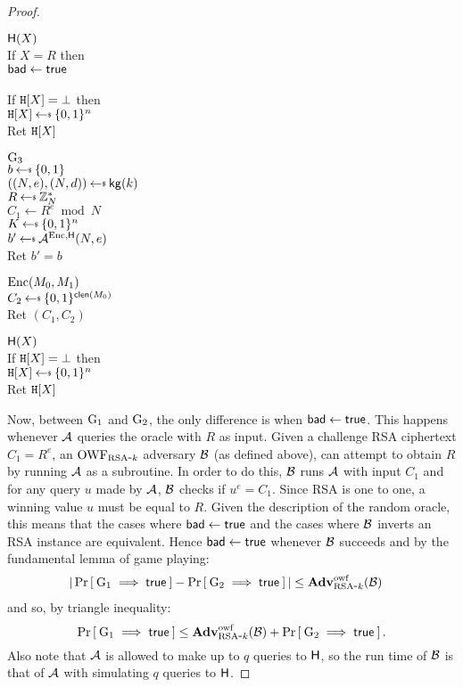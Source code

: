 \begin{proof}
\begin{center}
{\underline{$\mathsf{H}(X)$}\\
If $X = R$ then\\
\myInd $\mathsf{bad}\gets\mathsf{true}$\\
\myInd {}\\
If $\mathtt{H}[X] = \bot$  then\\
\myInd $\TabH[X] \getsr \bits^n$\\
Ret $\mathtt{H}[X]$
}{
\underline{${{\textnormal G}}_3$}\\ %
$b \getsr \bits$\\
$((N,e),(N,d)) \getsr \kg(k)$\\
$R \getsr \Z^*_N$\\
$C_1 \gets R^e \bmod N$\\
$K \getsr \bits^n$\\
$b' \getsr \advA^{\EncOracle,\Horacle}(N,e)$\\
Ret $b'=b$\medskip

\underline{$\textnormal{Enc}(M_0,M_1)$}\\
$C_2 \getsr \bits^{\ctxtlen(M_0)}$\\
Ret $(C_1,C_2)$\medskip

\underline{$\mathsf{H}(X)$}\\
If $\mathtt{H}[X] = \bot$  then\\
\myInd $\TabH[X] \getsr \bits^n$\\
Ret $\mathtt{H}[X]$
}

\end{center}

Now, between ${{\textnormal G}}_1$ and ${{\textnormal G}}_2$, the only difference is when $\mathsf{bad}\gets\mathsf{true}$. This happens whenever ${\mathcal A}$ queries the oracle with $R$ as input. Given a challenge RSA ciphertext $C_1 = R^e$, an $\textnormal{OWF}_{\textnormal{RSA}\mbox{-} k}$ adversary ${\mathcal B}$ (as defined above), can attempt to obtain $R$ by running ${\mathcal A}$ as a subroutine. In order to do this, ${\mathcal B}$ runs ${\mathcal A}$ with input $C_1$ and for any query $u$ made by ${\mathcal A}$, ${\mathcal B}$ checks if $u^e = C_1$. Since RSA is one to one, a winning value $u$ must be equal to $R$. Given the description of the random oracle, this means that the cases where $\mathsf{bad}\gets\mathsf{true}$ and the cases where ${\mathcal B}$ inverts an RSA instance are equivalent. Hence $\mathsf{bad}\gets\mathsf{true}$ whenever ${\mathcal B}$ succeeds and by the fundamental lemma of game playing:
\begin{align*}
|\Pr\left[\: {{\textnormal G}}_1 \implies \mathsf{true} \:\right] - \Pr\left[\: {{\textnormal G}}_2\implies \mathsf{true} \:\right]| &\leq \mathbf{Adv}^{\mathrm{owf}}_{{\textnormal{RSA}\mbox{-} k}}({\mathcal B})
\end{align*}
and so, by triangle inequality:
\[
\Pr\left[\: {{\textnormal G}}_1 \implies \mathsf{true} \:\right] \le \mathbf{Adv}^{\mathrm{owf}}_{{\textnormal{RSA}\mbox{-} k}}({\mathcal B}) + \Pr\left[\: {{\textnormal G}}_2 \implies \mathsf{true} \:\right].
\]
Also note that ${\mathcal A}$ is allowed to make up to $q$ queries to $\mathsf{H}$, so the run time of ${\mathcal B}$ is that of ${\mathcal A}$ with simulating $q$ queries to $\mathsf{H}$.


\end{proof}
